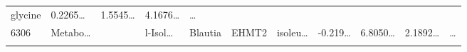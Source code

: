 \documentclass[
]{article}
\begin{document}
\begin{longtable}[]{@{}lllllllllll@{}}
\begin{minipage}[t]{0.09\columnwidth}
glycine\strut
\end{minipage} & \begin{minipage}[t]{0.07\columnwidth}\raggedright
0.2265\ldots{}\strut
\end{minipage} & \begin{minipage}[t]{0.07\columnwidth}\raggedright
1.5545\ldots{}\strut
\end{minipage} & \begin{minipage}[t]{0.07\columnwidth}\raggedright
4.1676\ldots{}\strut
\end{minipage} & \begin{minipage}[t]{0.03\columnwidth}\raggedright
\ldots{}\strut
\end{minipage}\tabularnewline
\begin{minipage}[t]{0.03\columnwidth}\raggedright
6306\strut
\end{minipage} & \begin{minipage}[t]{0.07\columnwidth}\raggedright
Metabo\ldots{}\strut
\end{minipage} & \begin{minipage}[t]{0.07\columnwidth}\raggedright
\strut
\end{minipage} & \begin{minipage}[t]{0.09\columnwidth}\raggedright
l-Isol\ldots{}\strut
\end{minipage} & \begin{minipage}[t]{0.07\columnwidth}\raggedright
Blautia\strut
\end{minipage} & \begin{minipage}[t]{0.07\columnwidth}\raggedright
EHMT2\strut
\end{minipage} & \begin{minipage}[t]{0.09\columnwidth}\raggedright
isoleu\ldots{}\strut
\end{minipage} & \begin{minipage}[t]{0.07\columnwidth}\raggedright
-0.219\ldots{}\strut
\end{minipage} & \begin{minipage}[t]{0.07\columnwidth}\raggedright
6.8050\ldots{}\strut
\end{minipage} & \begin{minipage}[t]{0.07\columnwidth}\raggedright
2.1892\ldots{}\strut
\end{minipage} & \begin{minipage}[t]{0.03\columnwidth}\raggedright
\ldots{}\strut
\end{minipage}\tabularnewline
\begin{minipage}[t]{0.03\columnwidth}\raggedright

\end{minipage}
\end{longtable}
\end{document}
